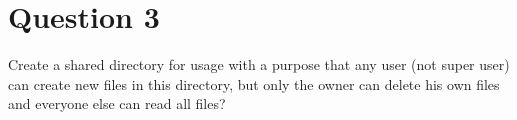 \documentclass[main.tex]{subfiles}
\begin{document}
\section{Question 3}

Create a shared directory for usage with a purpose that any user (not super
user) can create new files in this directory, but only the owner can delete his
own files and everyone else can read all files?


\end{document}
